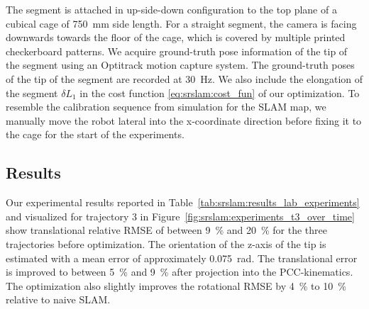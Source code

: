 %
The segment is attached in up-side-down configuration to the top plane of a cubical cage of \SI{750}{mm} side length. For a straight segment, the camera is facing downwards towards the floor of the cage, which is covered by multiple printed checkerboard patterns.
%
We acquire ground-truth pose information of the tip of the segment using an Optitrack motion capture system. %
The ground-truth poses of the tip of the segment are recorded at \SI{30}{Hz}. %
%
%
We also include the elongation of the segment $\delta L_1$ in the cost function \eqref{eq:srslam:cost_fun} of our optimization.
%
To resemble the calibration sequence from simulation for the \gls{SLAM} map, we manually move the robot lateral into the x-coordinate direction before fixing it to the cage for the start of the experiments.

\subsection{Results}
Our experimental results reported in Table~\ref{tab:srslam:results_lab_experiments} and visualized for trajectory 3 in Figure~\ref{fig:srslam:experiments_t3_over_time} show translational relative \gls{RMSE} of between \SI{9}{\percent} and \SI{20}{\percent} for the three trajectories before optimization. 
The orientation of the z-axis of the tip is estimated with a mean error of approximately \SI{0.075}{\radian}.
The translational error is improved to between \SI{5}{\percent} and \SI{9}{\percent} after projection into the \gls{PCC}-kinematics. 
The optimization also slightly improves the rotational \gls{RMSE} by \SI{4}{\percent} to \SI{10}{\percent} relative to naive \gls{SLAM}.

